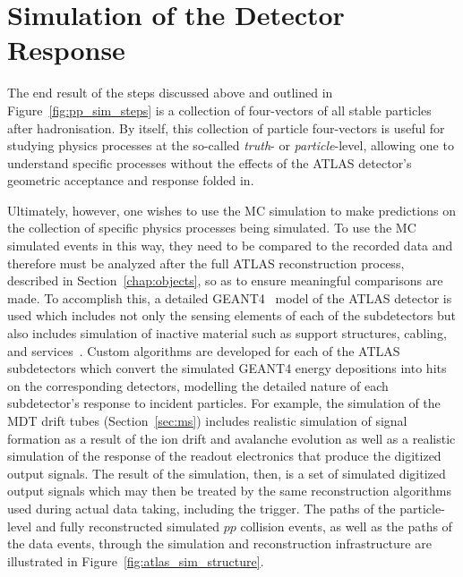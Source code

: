 \section{Simulation of the Detector Response}
\label{sec:detector_sim}

The end result of the steps discussed above and outlined in Figure~\ref{fig:pp_sim_steps}
is a collection of four-vectors of all stable particles after hadronisation.%
By itself, this collection of particle four-vectors is useful for studying physics processes at
the so-called \textit{truth}- or \textit{particle}-level, allowing one to understand specific
processes without the effects of the ATLAS detector's geometric acceptance and response folded in.

Ultimately, however, one wishes to use the MC simulation to make predictions on the collection of specific physics
processes being simulated.
To use the MC simulated events in this way, they need to be compared to the recorded data and therefore must be analyzed after
the full ATLAS reconstruction process, described in Section~\ref{chap:objects}, so as to ensure meaningful comparisons are made.
To accomplish this, a detailed \textsc{GEANT4}~\cite{GEANT4} model of the ATLAS detector is used
which includes not only the sensing elements of each of the subdetectors but also includes
simulation of inactive material such as support structures, cabling, and services~\cite{ATLASSim}.
Custom algorithms are developed for each of the ATLAS subdetectors which convert the simulated \textsc{GEANT4}
energy depositions into hits on the corresponding detectors, modelling the detailed nature
of each subdetector's response to incident particles.
For example, the simulation of the MDT drift tubes (Section~\ref{sec:ms}) includes realistic simulation of signal formation as a result of the ion
drift and avalanche evolution as well as a realistic simulation of the response
of the readout electronics that produce the digitized output signals.
The result of the simulation, then, is a set of simulated digitized output signals which
may then be treated by the same reconstruction algorithms used during actual data taking, including the trigger.
The paths of the particle-level and fully reconstructed simulated $pp$ collision events, as well
as the paths of the data events, through the simulation and reconstruction infrastructure are illustrated in Figure~\ref{fig:atlas_sim_structure}.

